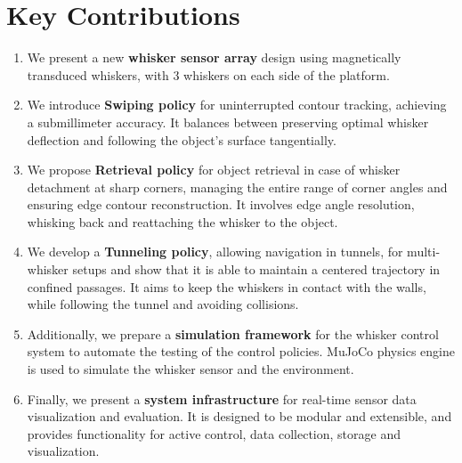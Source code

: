 \section{Key Contributions}

\begin{enumerate}
    \item We present a new \textbf{whisker sensor array} design using magnetically transduced whiskers, with 3 whiskers on each side of the platform.
    \item We introduce \textbf{Swiping policy} for uninterrupted contour tracking, achieving a submillimeter accuracy.
    It balances between preserving optimal whisker deflection and following the object's surface tangentially.
    \item We propose \textbf{Retrieval policy} for object retrieval in case of whisker detachment at sharp corners, managing the entire range of corner angles and ensuring edge contour reconstruction.
    It involves edge angle resolution, whisking back and reattaching the whisker to the object.
    \item We develop a \textbf{Tunneling policy}, allowing navigation in tunnels, for multi-whisker setups and show that it is able to maintain a centered trajectory in confined passages.
    It aims to keep the whiskers in contact with the walls, while following the tunnel and avoiding collisions.
    \item Additionally, we prepare a \textbf{simulation framework} for the whisker control system to automate the testing of the control policies.
    MuJoCo physics engine is used to simulate the whisker sensor and the environment.
    \item Finally, we present a \textbf{system infrastructure} for real-time sensor data visualization and evaluation.
    It is designed to be modular and extensible, and provides functionality for active control, data collection, storage and visualization.
\end{enumerate}
